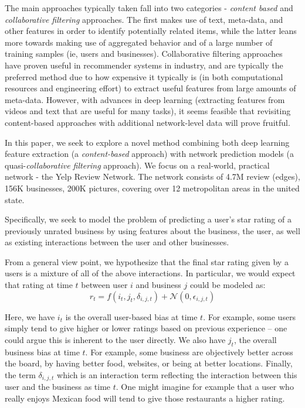 \documentclass[letterpaper, 10 pt, conference]{ieeeconf}  %
\begin{document}
The main approaches typically taken fall into two categories - \textit{content based} and \textit{collaborative filtering} approaches. The first makes use of text, meta-data, and other features in order to identify potentially related items, while the latter leans more towards making use of aggregated behavior and of a large number of training samples (ie, users and businesses). Collaborative filtering approaches have proven useful in recommender systems in industry, and are typically the preferred method due to how expensive it typically is (in both computational resources and engineering effort) to extract useful features from large amounts of meta-data. However, with advances in deep learning (extracting features from videos and text that are useful for many tasks), it seems feasible that revisiting content-based approaches with additional network-level data will prove fruitful.

In this paper, we seek to explore a novel method combining both deep learning feature extraction (a \textit{content-based} approach) with network prediction models (a quasi-\textit{collaborative filtering} approach). We focus on a real-world, practical network - the Yelp Review Network. The network consists of 4.7M review (edges), 156K businesses, 200K pictures, covering over 12 metropolitan areas in the united state.

Specifically, we seek to model the problem of predicting a user's star rating of a previously unrated business by using features about the business, the user, as well as existing interactions between the user and other businesses.

From a general view point, we hypothesize that the final star rating given by a users is a mixture of all of the above interactions. In particular, we would expect that rating at time $t$ between user $i$ and business $j$ could be modeled as:
$$
r_t = f(i_t, j_t, \delta_{i,j,t}) + \mathcal{N}(0,\epsilon_{i,j,t})
$$

Here, we have $i_t$ is the overall user-based bias at time $t$. For example, some users simply tend to give higher or lower ratings based on previous experience -- one could argue this is inherent to the user directly. We also have $j_t$, the overall business bias at time $t$. For example, some business are objectively better across the board, by having better food, websites, or being at better locations. Finally, the term $\delta_{i,j,t}$ which is an interaction term reflecting the interaction between this user and the business as time $t$. One might imagine for example that a user who really enjoys Mexican food will tend to give those restaurants a higher rating.
\end{document}
